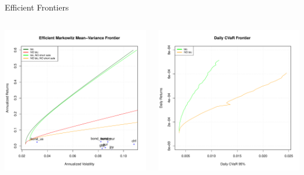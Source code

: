 \documentclass[c, 10pt]{beamer}
\begin{document}
\begin{frame}{Efficient Frontiers}
\begin{columns}
	\begin{column}{0.5\textwidth}
		\includegraphics[width=\textwidth]{Images/efficient_frontier}
	\end{column}
	\begin{column}{0.5\textwidth}  %
			\includegraphics[width=\textwidth]{Images/efficient_frontier_CVaR}
	\end{column}
\end{columns}
\end{frame}
\end{document}
